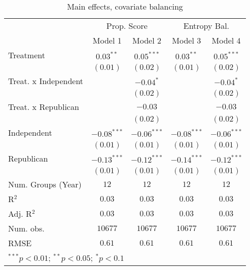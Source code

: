 
\begin{table}
\caption{Main effects, covariate balancing}
\begin{center}
\begin{tabular}{l c c c c}
\toprule
 & \multicolumn{2}{c}{Prop. Score} & \multicolumn{2}{c}{Entropy Bal.} \\
\cmidrule(lr){2-3} \cmidrule(lr){4-5}
 & Model 1 & Model 2 & Model 3 & Model 4 \\
\midrule
Treatment            & $0.03^{**}$   & $0.05^{***}$  & $0.03^{**}$   & $0.05^{***}$  \\
                     & $(0.01)$      & $(0.02)$      & $(0.01)$      & $(0.02)$      \\
Treat. x Independent &               & $-0.04^{*}$   &               & $-0.04^{*}$   \\
                     &               & $(0.02)$      &               & $(0.02)$      \\
Treat. x Republican  &               & $-0.03$       &               & $-0.03$       \\
                     &               & $(0.02)$      &               & $(0.02)$      \\
Independent          & $-0.08^{***}$ & $-0.06^{***}$ & $-0.08^{***}$ & $-0.06^{***}$ \\
                     & $(0.01)$      & $(0.01)$      & $(0.01)$      & $(0.01)$      \\
Republican           & $-0.13^{***}$ & $-0.12^{***}$ & $-0.14^{***}$ & $-0.12^{***}$ \\
                     & $(0.01)$      & $(0.01)$      & $(0.01)$      & $(0.01)$      \\
\midrule
Num. Groups (Year)   & $12$          & $12$          & $12$          & $12$          \\
R$^2$                & $0.03$        & $0.03$        & $0.03$        & $0.03$        \\
Adj. R$^2$           & $0.03$        & $0.03$        & $0.03$        & $0.03$        \\
Num. obs.            & $10677$       & $10677$       & $10677$       & $10677$       \\
RMSE                 & $0.61$        & $0.61$        & $0.61$        & $0.61$        \\
\bottomrule
\multicolumn{5}{l}{\scriptsize{$^{***}p<0.01$; $^{**}p<0.05$; $^{*}p<0.1$}}
\end{tabular}
\label{table_ate_balance}
\end{center}
\end{table}
